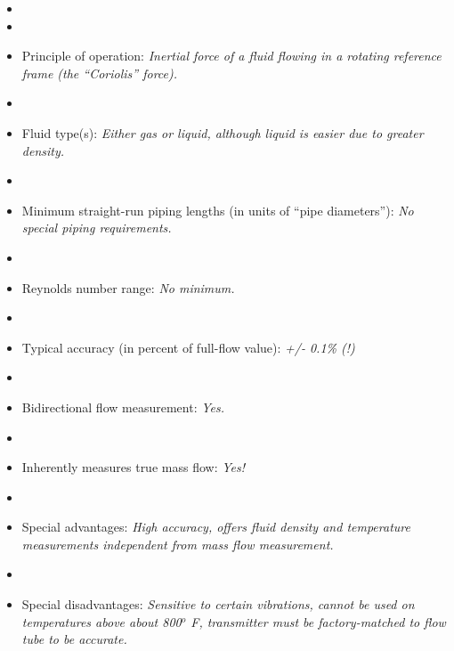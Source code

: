 \documentclass[12pt,a4paper]{article}
\begin{document}
\begin{itemize}
\goodbreak
\item{} 
\vskip 5pt
\item\item{} Principle of operation: {\it Inertial force of a fluid flowing in a rotating reference frame (the ``Coriolis'' force).}
\vskip 5pt
\item\item{} Fluid type(s): {\it Either gas or liquid, although liquid is easier due to greater density.}
\vskip 5pt
\item\item{} Minimum straight-run piping lengths (in units of ``pipe diameters''): {\it No special piping requirements.}
\vskip 5pt
\item\item{} Reynolds number range: {\it No minimum.}
\vskip 5pt
\item\item{} Typical accuracy (in percent of full-flow value): {\it +/- 0.1\% (!)}
\vskip 5pt
\item\item{} Bidirectional flow measurement: {\it Yes.}
\vskip 5pt
\item\item{} Inherently measures true mass flow: {\it Yes!}
\vskip 5pt
\item\item{} Special advantages: {\it High accuracy, offers fluid density and temperature measurements independent from mass flow measurement.}
\vskip 5pt
\item\item{} Special disadvantages: {\it Sensitive to certain vibrations, cannot be used on temperatures above about 800$^{o}$ F, transmitter must be factory-matched to flow tube to be accurate.}
\end{itemize}
\end{document}
